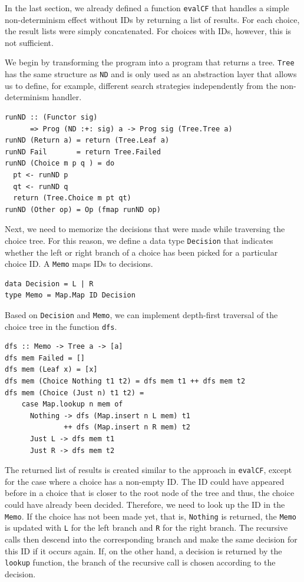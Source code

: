 \documentclass[a4paper, 11pt, fleqn, twoside, abstract=on]{scrreprt}
\newcommand{\hinl}[1]{\texttt{#1}}
\begin{document}
In the last section, we already defined a function \hinl{evalCF} that handles a simple non-determinism effect without IDs by returning a list of results.
For each choice, the result lists were simply concatenated.
For choices with IDs, however, this is not sufficient.

We begin by transforming the program into a program that returns a tree.
\hinl{Tree} has the same structure as \hinl{ND} and is only used as an abstraction layer that allows us to define, for example, different search strategies independently from the non-determinism handler.
 
\begin{verbatim}
runND :: (Functor sig) 
      => Prog (ND :+: sig) a -> Prog sig (Tree.Tree a)
runND (Return a) = return (Tree.Leaf a)
runND Fail       = return Tree.Failed
runND (Choice m p q ) = do
  pt <- runND p
  qt <- runND q
  return (Tree.Choice m pt qt)
runND (Other op) = Op (fmap runND op)
\end{verbatim}

Next, we need to memorize the decisions that were made while traversing the choice tree.
For this reason, we define a data type \hinl{Decision} that indicates whether the left or right branch of a choice has been picked for a particular choice ID.
A \hinl{Memo} maps IDs to decisions.

\begin{verbatim}
data Decision = L | R
type Memo = Map.Map ID Decision
\end{verbatim}

Based on \hinl{Decision} and \hinl{Memo}, we can implement depth-first traversal of the choice tree in the function \hinl{dfs}.

\begin{verbatim}
dfs :: Memo -> Tree a -> [a]
dfs mem Failed = []
dfs mem (Leaf x) = [x]
dfs mem (Choice Nothing t1 t2) = dfs mem t1 ++ dfs mem t2
dfs mem (Choice (Just n) t1 t2) =
    case Map.lookup n mem of
      Nothing -> dfs (Map.insert n L mem) t1 
              ++ dfs (Map.insert n R mem) t2
      Just L -> dfs mem t1
      Just R -> dfs mem t2
\end{verbatim}
\noindent
The returned list of results is created similar to the approach in \hinl{evalCF}, except for the case where a choice has a non-empty ID.
The ID could have appeared before in a choice that is closer to the root node of the tree and thus, the choice could have already been decided.
Therefore, we need to look up the ID in the \hinl{Memo}.
If the choice has not been made yet, that is, \hinl{Nothing} is returned, the \hinl{Memo} is updated with \hinl{L} for the left branch and \hinl{R} for the right branch.
The recursive calls then descend into the corresponding branch and make the same decision for this ID if it occurs again.
If, on the other hand, a decision is returned by the \hinl{lookup} function, the branch of the recursive call is chosen according to the decision.
\end{document}
